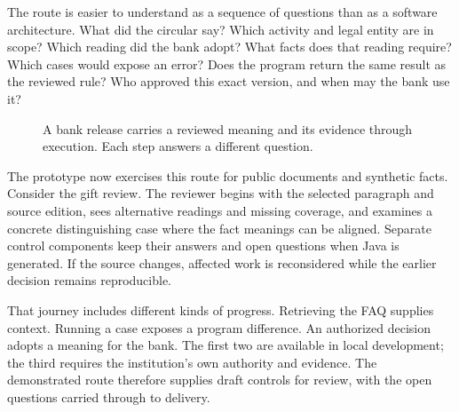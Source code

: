 The route is easier to understand as a sequence of questions than as a software
architecture. What did the circular say? Which activity and legal entity are in
scope? Which reading did the bank adopt? What facts does that reading require?
Which cases would expose an error? Does the program return the same result as the
reviewed rule? Who approved this exact version, and when may the bank use it?

\begin{figure}[htbp]
\centering
{}
\caption{A bank release carries a reviewed meaning and its evidence through
execution. Each step answers a different question.}
\label{fig:reader-implementation-route}
\end{figure}

The prototype now exercises this route for public documents and synthetic facts.
Consider the gift review. The reviewer begins with the selected paragraph and
source edition, sees alternative readings and missing coverage, and examines a
concrete distinguishing case where the fact meanings can be aligned. Separate
control components keep their answers and open questions when Java is generated.
If the source changes, affected work is reconsidered while the earlier decision
remains reproducible.

That journey includes different kinds of progress. Retrieving the FAQ supplies
context. Running a case exposes a program difference. An authorized decision
adopts a meaning for the bank. The first two are available in local development;
the third requires the institution's own authority and evidence. The demonstrated
route therefore supplies draft controls for review, with the open questions
carried through to delivery.

